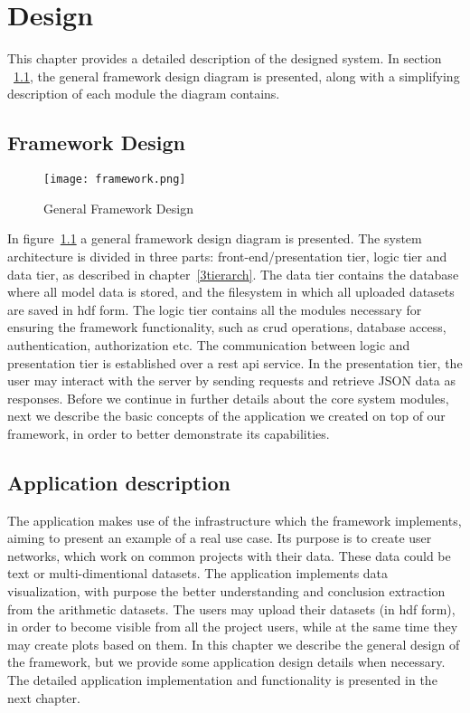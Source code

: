 
\chapter{Design} %

This chapter provides a detailed description of the designed system. In section ~\ref{gfd}, the general framework design diagram is presented, along with a simplifying description of each module the diagram contains. 


\section{Framework Design}
\label{gfd}
\begin{figure}
	\texttt{[image: framework.png]}
	\caption{General Framework Design}
	\label{framework}
\end{figure}
In figure~\ref{framework} a general framework design diagram is presented. The system architecture is divided in three parts: front-end/presentation tier, logic tier and data tier, as described in chapter~\ref{3tierarch}. The data tier contains the database where all model data is stored, and the filesystem in which all uploaded datasets are saved in hdf form. The logic tier contains all the modules necessary for ensuring the framework functionality, such as crud operations, database access, authentication, authorization etc. The communication between logic and presentation tier is established over a rest api service. In the presentation tier, the user may interact with the server by sending requests and retrieve JSON data as responses. Before we continue in further details about the core system modules, next we describe the basic concepts of the application we created on top of our framework, in order to better demonstrate its capabilities.

\section{Application description}
The application makes use of the infrastructure which the framework implements, aiming to present an example of a real use case. Its purpose is to create user networks, which work on common projects with their data. These data could be text or multi-dimentional datasets. The application implements data visualization, with purpose the better understanding and conclusion extraction from the arithmetic datasets. The users may upload their datasets (in hdf form), in order to become visible from all the project users, while at the same time they may create plots based on them. In this chapter we describe the general design of the framework, but we provide some application design details when necessary. The detailed application implementation and functionality is presented in the next chapter.

